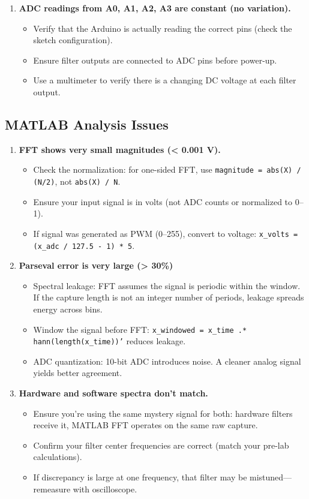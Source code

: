 \documentclass[11pt,letterpaper]{article}
\begin{document}
\begin{enumerate}
    \item \textbf{ADC readings from A0, A1, A2, A3 are constant (no variation).}
    \begin{itemize}
        \item Verify that the Arduino is actually reading the correct pins (check the sketch configuration).
        \item Ensure filter outputs are connected to ADC pins before power-up.
        \item Use a multimeter to verify there is a changing DC voltage at each filter output.
    \end{itemize}
\end{enumerate}

\subsection*{MATLAB Analysis Issues}

\begin{enumerate}
    \item \textbf{FFT shows very small magnitudes (< 0.001 V).}
    \begin{itemize}
        \item Check the normalization: for one-sided FFT, use \texttt{magnitude = abs(X) / (N/2)}, not \texttt{abs(X) / N}.
        \item Ensure your input signal is in volts (not ADC counts or normalized to 0--1).
        \item If signal was generated as PWM (0--255), convert to voltage: \texttt{x\_volts = (x\_adc / 127.5 - 1) * 5}.
    \end{itemize}

    \item \textbf{Parseval error is very large (> 30\%)}\\
    \begin{itemize}
        \item Spectral leakage: FFT assumes the signal is periodic within the window. If the capture length is not an integer number of periods, leakage spreads energy across bins.
        \item Window the signal before FFT: \texttt{x\_windowed = x\_time .* hann(length(x\_time))'} reduces leakage.
        \item ADC quantization: 10-bit ADC introduces noise. A cleaner analog signal yields better agreement.
    \end{itemize}

    \item \textbf{Hardware and software spectra don't match.}
    \begin{itemize}
        \item Ensure you're using the same mystery signal for both: hardware filters receive it, MATLAB FFT operates on the same raw capture.
        \item Confirm your filter center frequencies are correct (match your pre-lab calculations).
        \item If discrepancy is large at one frequency, that filter may be mistuned—remeasure with oscilloscope.
    \end{itemize}
\end{enumerate}
\end{document}
